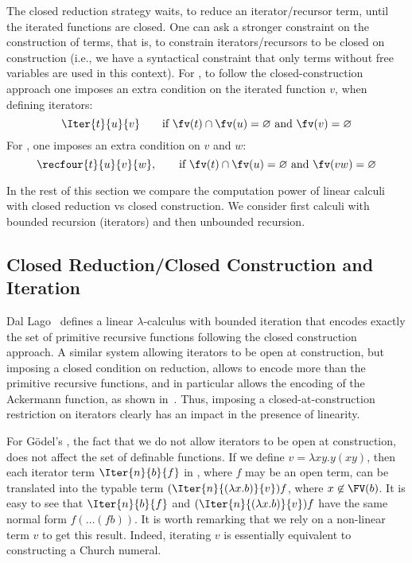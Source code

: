 \documentclass{article}
\begin{document}
The closed reduction strategy waits, to reduce an iterator/recursor
term, until the iterated functions are closed. One can ask a stronger
constraint on the construction of terms, that is, to constrain
iterators/recursors to be closed on construction (i.e., we have a
syntactical constraint that only terms without free variables are used
in this context).  For \LLCI, to follow the closed-construction approach
one imposes an extra condition on the
iterated function $v$, when defining iterators:
\[
\Iter{t}{u}{v} \qquad \mbox{if $ \fv(t)\cap \fv(u) = \varnothing$ and $\fv(v)=\varnothing$} 
\]
For \LLCIrec, one imposes an extra condition on $v$ and $w$:
\[
\recfour{t}{u}{v}{w},\qquad\mbox{if $\fv(t)\cap \fv(u)= \varnothing$ and $\fv(vw) = \varnothing$} 
\]

In the rest of this section we compare the computation power of linear calculi
with closed reduction vs closed construction. We consider first calculi
 with bounded recursion (iterators) and then unbounded recursion.

\subsection{Closed Reduction/Closed Construction and Iteration}
Dal Lago~\cite{Lago05} defines a linear $\lambda$-calculus with
bounded iteration that encodes exactly the set of primitive recursive
functions following the closed construction approach. 
A similar system allowing iterators to be open at
construction, but imposing a closed condition on reduction, allows to
encode more than the primitive recursive functions, and in particular
allows the encoding of the Ackermann function, as shown
in~\cite{AlvesFFM07}.
Thus, imposing a closed-at-construction restriction on iterators clearly has
an impact in the presence of linearity. 


For G\"odel's \ST, the fact that we do not allow iterators to be open
at construction, does not affect the set of definable functions.  If
we define $v = \lambda xy.y(x y)$, then each iterator term
$\Iter{n}{b}{f}$ in \ST, where $f$ may be an open term, can be
translated into the typable term $(\Iter{n}{(\lambda x.b)}{v})f$,
where $x\not\in\FV(b)$. It is easy to see that $\Iter{n}{b}{f}$ and
$(\Iter{n}{(\lambda x.b)}{v})f$ have the same normal form $f(\ldots(f
b))$. It is worth remarking that we rely on a non-linear term $v$ to
get this result. Indeed, iterating $v$ is essentially equivalent to
constructing a Church numeral.
\end{document}
